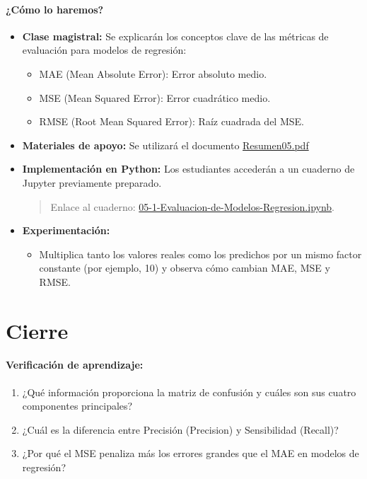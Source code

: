 \documentclass[a4,11pt]{aleph-notas}
\begin{document}
\paragraph{¿Cómo lo haremos?}  
\begin{itemize}[leftmargin=*]
    \item \textbf{Clase magistral:}  
    Se explicarán los conceptos clave de las métricas de evaluación para modelos de regresión:
    \begin{itemize}
        \item MAE (Mean Absolute Error): Error absoluto medio.
        \item MSE (Mean Squared Error): Error cuadrático medio.
        \item RMSE (Root Mean Squared Error): Raíz cuadrada del MSE.
    \end{itemize}
    \item \textbf{Materiales de apoyo:} 
    Se utilizará el documento \href{https://andres-merino.github.io/AprendizajeAutomaticoInicial-05-N0105/2-Resumenes/Resumen05.pdf}{Resumen05.pdf}
    \item \textbf{Implementación en Python:} Los estudiantes accederán a un cuaderno de Jupyter previamente preparado.
    \begin{quote}
        Enlace al cuaderno: \href{https://github.com/andres-merino/AprendizajeAutomaticoInicial-05-N0105/blob/main/2-Notebooks/05-1-Evaluacion-de-Modelos-Regresion.ipynb}{05-1-Evaluacion-de-Modelos-Regresion.ipynb}.
    \end{quote}

    \item \textbf{Experimentación:} 
    \begin{itemize}
        \item Multiplica tanto los valores reales como los predichos por un mismo factor constante (por ejemplo, 10) y observa cómo cambian MAE, MSE y RMSE.
    \end{itemize}
\end{itemize}

\section*{Cierre}

\paragraph{Verificación de aprendizaje:} 
\begin{enumerate}[leftmargin=*]
    \item ¿Qué información proporciona la matriz de confusión y cuáles son sus cuatro componentes principales?
    
    \item ¿Cuál es la diferencia entre Precisión (Precision) y Sensibilidad (Recall)?
    
    \item ¿Por qué el MSE penaliza más los errores grandes que el MAE en modelos de regresión?
\end{enumerate}
\end{document}
